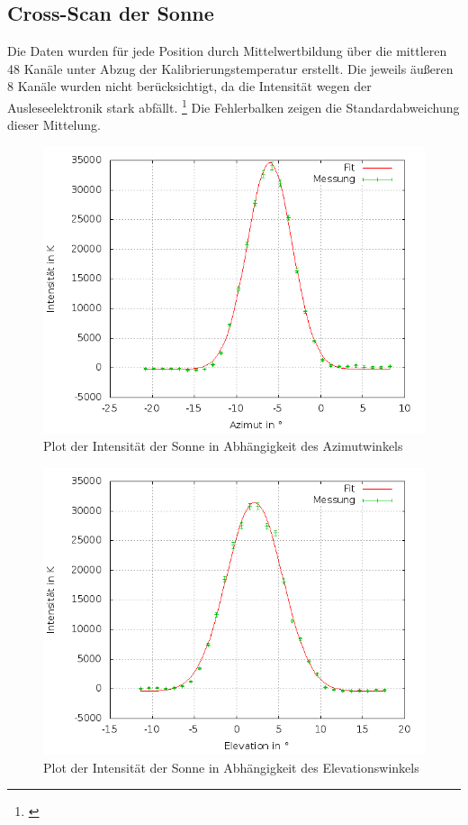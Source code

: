 \subsection{Cross-Scan der Sonne}
Die Daten wurden für jede Position durch Mittelwertbildung über die mittleren 48 Kanäle unter Abzug der Kalibrierungstemperatur erstellt. Die jeweils äußeren 8 Kanäle wurden nicht berücksichtigt, da die Intensität wegen der Ausleseelektronik stark abfällt. \footnote{\cite{ronomischesPraktikum}} Die Fehlerbalken zeigen die Standardabweichung dieser Mittelung.
\begin{figure}
		\includegraphics[width=.9\textwidth]{images/sun_azimut}
\caption{ Plot der Intensität der Sonne in Abhängigkeit des Azimutwinkels }
\label{fig:sunaz}
\end{figure}

\begin{figure}
		\includegraphics[width=.9\textwidth]{images/sun_elevation}
\caption{ Plot der Intensität der Sonne in Abhängigkeit des Elevationswinkels }
\label{fig:sunel}
\end{figure}

